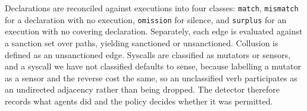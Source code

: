 \1\noindent Declarations are reconciled against executions into four
classes: \texttt{match}, \texttt{mismatch} for a declaration with no execution,
\texttt{omission} for silence, and \texttt{surplus} for an execution with no
covering declaration. Separately, each edge is evaluated against a sanction set
over paths, yielding sanctioned or unsanctioned. Collusion is defined as an
unsanctioned edge. Syscalls are classified as mutators or sensors, and a syscall
we have not classified defaults to sense, because labelling a mutator as a sensor
and the reverse cost the same, so an unclassified verb participates as an
undirected adjacency rather than being dropped. The detector therefore records
what agents did and the policy decides whether it was permitted.


